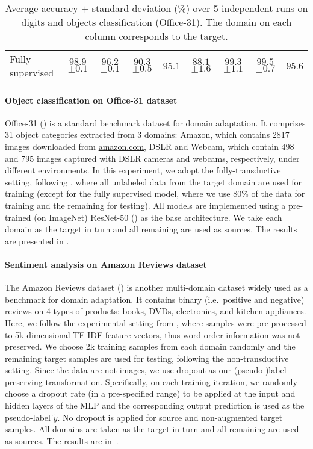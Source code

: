\begin{table}
\begin{tabular}{l|ccc:c|ccc:c}
		Fully supervised            & $ 98.9 $ \tiny{$ \pm 0.1 $}  & $ 96.2 $ \tiny{$ \pm 0.1 $}   & $ 90.3 $ \tiny{$ \pm 0.5 $} & $95.1$ & $ 88.1 $ \tiny{$ \pm 1.6 $}   & $ 99.3 $ \tiny{$ \pm 1.1 $}       & $ 99.5 $ \tiny{$ \pm 0.7 $} & $95.6$
	\end{tabular}
	\caption{Average accuracy $\pm$ standard deviation (\%) over 5 independent runs on digits and objects classification (Office-31). The domain on each column corresponds to the target.}
	\label{tab:digits_office_acc}
\end{table}

\paragraph{Object classification on Office-31 dataset} Office-31 (\citet{Saenko2010}) is a standard benchmark dataset for domain adaptation. It comprises 31 object categories extracted from 3 domains: Amazon, which contains 2817 images downloaded from \url{amazon.com}, DSLR and Webcam, which contain 498 and 795 images captured with DSLR cameras and webcams, respectively, under different environments. In this experiment, we adopt the fully-transductive setting, following \citet{Pei2018}, where all unlabeled data from the target domain are used for training (except for the fully supervised model, where we use 80\% of the data for training and the remaining for testing). All models are implemented using a pre-trained (on ImageNet) ResNet-50 (\citet{He2016}) as the base architecture. We take each domain as the target in turn and all remaining are used as sources. The results are presented in .

\paragraph{Sentiment analysis on Amazon Reviews dataset} The Amazon Reviews dataset (\citet{Blitzer2007}) is another multi-domain dataset widely used as a benchmark for domain adaptation. It contains binary (i.e.\ positive and negative) reviews on 4 types of products: books, DVDs, electronics, and kitchen appliances. Here, we follow the experimental setting from \citet{Chen2012}, where samples were pre-processed to 5k-dimensional TF-IDF feature vectors, thus word order information was not preserved. We choose 2k training samples from each domain randomly and the remaining target samples are used for testing, following the non-transductive setting. Since the data are not images, we use dropout as our (pseudo-)label-preserving transformation. Specifically, on each training iteration, we randomly choose a dropout rate (in a pre-specified range) to be applied at the input and hidden layers of the MLP and the corresponding output prediction is used as the pseudo-label $\tilde{y}$. No dropout is applied for source and non-augmented target samples. All domains are taken as the target in turn and all remaining are used as sources. The results are in~.


